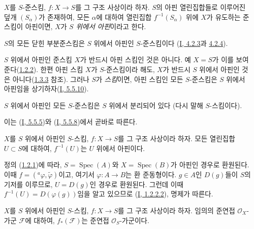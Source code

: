 \begin{env}[1.2.1]
\label{II.1.2.1-ko}
$X$를 $S$-준스킴, $f:X\to S$를 그 구조 사상이라 하자.
$S$의 아핀 열린집합들로 이루어진 덮개 $(S_\alpha)$가 존재하여,
모든 $\alpha$에 대하여 열린집합 $f^{-1}(S_\alpha)$ 위에 $X$가
유도하는 준스킴이 아핀이면, $X$가 \emph{$S$ 위에서 아핀}이라고
한다.
\end{env}

\begin{env}[1.2.2]
\label{II.1.2.2-ko}
$S$의 모든 닫힌 부분준스킴은 $S$ 위에서 아핀인
$S$-준스킴이다
(\hyperref[I.4.2.3-ko]{I, 4.2.3}과
\hyperref[I.4.2.4-ko]{4.2.4}).
\end{env}

\begin{env}[1.2.3]
\label{II.1.2.3-ko}
$S$ 위에서 아핀인 준스킴 $X$가 반드시 아핀 스킴인 것은 아니다. 예
$X=S$가 이를 보여 준다(\hyperref[II.1.2.2-ko]{1.2.2}). 한편 아핀 스킴
$X$가 $S$-준스킴이라 해도, $X$가 반드시 $S$ 위에서 아핀인
것은 아니다(\hyperref[II.1.3.3-ko]{1.3.3} 참조). 그러나 $S$가
\emph{스킴}이면, 아핀 스킴인 모든 $S$-준스킴은 $S$ 위에서 아핀임을
상기하자(\hyperref[I.5.5.10-ko]{I, 5.5.10}).
\end{env}

\begin{env}[1.2.4]
\label{II.1.2.4-ko}
$S$ 위에서 아핀인 모든 $S$-준스킴은 $S$ 위에서 분리되어 있다
(다시 말해 $S$-스킴이다).
\end{env}

이는 (\hyperref[I.5.5.5-ko]{I, 5.5.5})와
(\hyperref[I.5.5.8-ko]{I, 5.5.8})에서 곧바로 따른다.

\begin{env}[1.2.5]
\label{II.1.2.5-ko}
$X$를 $S$ 위에서 아핀인 $S$-스킴, $f:X\to S$를 그 구조 사상이라
하자. 모든 열린집합 $U\subset S$에 대하여, $f^{-1}(U)$는 $U$ 위에서
아핀이다.
\end{env}

정의 (\hyperref[II.1.2.1-ko]{1.2.1})에 따라,
$S=\operatorname{Spec}(A)$와 $X=\operatorname{Spec}(B)$가 아핀인
경우로 환원된다. 이때 $f=({}^a\varphi,\widetilde{\varphi})$이고,
여기서 $\varphi:A\to B$는 환 준동형이다. $g\in A$인 $D(g)$들이
$S$의 기저를 이루므로, $U=D(g)$인 경우로 환원된다. 그런데 이때
$f^{-1}(U)=D(\varphi(g))$임을 알고 있으므로
(\hyperref[I.1.2.2.2-ko]{I, 1.2.2.2}), 명제가 따른다.

\begin{env}[1.2.6]
\label{II.1.2.6-ko}
$X$를 $S$ 위에서 아핀인 $S$-스킴, $f:X\to S$를 그 구조 사상이라
하자. 임의의 준연접 $\mathcal{O}_X$-가군 $\mathcal{F}$에 대하여,
$f_*(\mathcal{F})$는 준연접 $\mathcal{O}_S$-가군이다.
\end{env}

